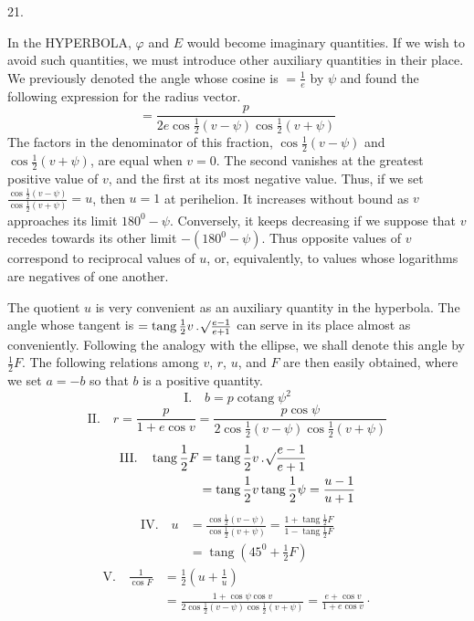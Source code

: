\par{}
\begin{center}
\hypertarget{native-038-article021}{}21.
\end{center}
In the HYPERBOLA, $\varphi$ and $E$ would become imaginary quantities. If we wish to avoid such quantities, we must introduce other auxiliary quantities in their place. We previously denoted the angle whose cosine is $=\frac{1}{e}$ by $\psi$ and found the following expression for the radius vector.
\[
=\frac{p}{2e\cos\frac{1}{2}(v-\psi)\cos\frac{1}{2}(v+\psi)}
\]
The factors in the denominator of this fraction, $\cos\frac{1}{2}(v-\psi)$ and $\cos\frac{1}{2}(v+\psi)$, are equal when $v=0$. The second vanishes at the greatest positive value of $v$, and the first at its most negative value. Thus, if we set $\frac{\cos\frac{1}{2}(v-\psi)}{\cos\frac{1}{2}(v+\psi)}=u$, then $u=1$ at perihelion. It increases without bound as $v$ approaches its limit $180^0-\psi$. Conversely, it keeps decreasing if we suppose that $v$ recedes towards its other limit $-(180^0-\psi)$. Thus opposite values of $v$ correspond to reciprocal values of $u$, or, equivalently, to values whose logarithms are negatives of one another.

The quotient $u$ is very convenient as an auxiliary quantity in the hyperbola. The angle whose tangent is $=\operatorname{tang}\frac{1}{2}v\, .\,\mathord{{}^{}\!\surd}\frac{e-1}{e+1}$ can serve in its place almost as conveniently. Following the analogy with the ellipse, we shall denote this angle by $\frac{1}{2}F$. The following relations among $v$, $r$, $u$, and $F$ are then easily obtained, where we set $a=-b$ so that $b$ is a positive quantity.
\[
\mathrm{I.}\quad b=p\operatorname{cotang}\psi^2
\]
\[
\mathrm{II.}\quad r=\frac{p}{1+e\cos v}=\frac{p\cos\psi}{2\cos\frac{1}{2}(v-\psi)\cos\frac{1}{2}(v+\psi)}
\]
\[
\begin{aligned}
\mathrm{III.}\quad\operatorname{tang}\frac{1}{2}F&=\operatorname{tang}\frac{1}{2}v\, .\,\mathord{{}^{}\!\surd}\frac{e-1}{e+1}\\
&=\operatorname{tang}\frac{1}{2}v\operatorname{tang}\frac{1}{2}\psi=\frac{u-1}{u+1}
\end{aligned}
\]
\[
\begin{aligned}
\mathrm{IV.}\quad u&=\frac{\cos\frac{1}{2}(v-\psi)}{\cos\frac{1}{2}(v+\psi)}=\frac{1+\operatorname{tang}\frac{1}{2}F}{1-\operatorname{tang}\frac{1}{2}F}\\
&=\operatorname{tang}(45^0+\frac{1}{2}F)
\end{aligned}
\]
\[
\begin{aligned}
\mathrm{V.}\quad\frac{1}{\cos F}&=\frac{1}{2}\left(u+\frac{1}{u}\right)\\
&=\frac{1+\cos\psi\cos v}{2\cos\frac{1}{2}(v-\psi)\cos\frac{1}{2}(v+\psi)}=\frac{e+\cos v}{1+e\cos v}\cdot
\end{aligned}
\]

